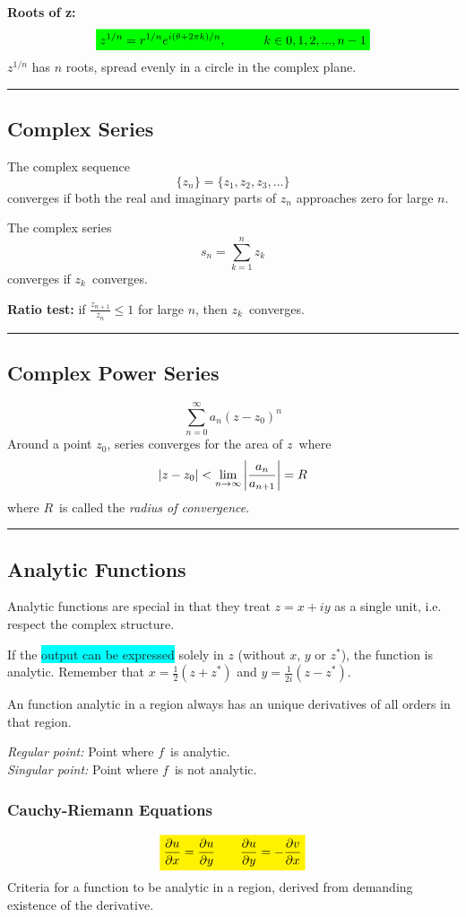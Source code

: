 \documentclass[10pt,a4paper]{article}
\renewcommand{\exp}{e^}
\newcommand{\holine}{\rule{286pt}{1pt}}
\newcommand{\half}{\frac{1}{2}}
\newcommand{\yl}[1]{\colorbox{yellow}{$\displaystyle #1$}}
\newcommand{\gr}[1]{\colorbox{green}{$\displaystyle #1$}}
\newcommand{\bll}{\colorbox{cyan}}
\begin{document}
\begin{multicols}{2}
\textbf{Roots of z:} 
\[\gr{
    z^{1/n} = r^{1/n}\exp{i(\theta + 2\pi k)/n}, \quad\quad\quad k\in 0,1,2,...,n-1
}\]
$z^{1/n}$ has $n$ roots, spread evenly in a circle in the complex plane.



\holine
\subsection*{Complex Series}
The complex sequence
\[
    \{z_n\} = \{z_1, z_2, z_3, ...\}
\]
converges if both the real and imaginary parts of $z_n$ approaches zero for large $n$.

The complex series
\[
    s_n = \sum_{k=1}^n z_k
\]
converges if $z_k$ converges.

\textbf{Ratio test:}
if $\frac{z_{n+1}}{z_n} \leq 1$ for large $n$, then $z_k$ converges.


\holine
\subsection*{Complex Power Series}
\[
    \sum_{n=0}^\infty a_n(z-z_0)^n
\]
Around a point $z_0$, series converges for the area of $z$ where
\[
    |z-z_0| < \lim_{n\rightarrow\infty} \qty|\frac{a_n}{a_{n+1}}| = R
\]
where $R$ is called the \textit{radius of convergence}.


\holine
\subsection*{Analytic Functions}
Analytic functions are special in that they treat $z=x+iy$ as a single unit, i.e. respect the complex structure.

If the \bll{output can be expressed} solely in $z$ (without $x$, $y$ or $z^*$), the function is analytic. Remember that $x = \half (z+z^*)$ and $y=\frac{1}{2i}(z-z^*)$.

An function analytic in a region always has an unique derivatives of all orders in that region.


\textit{Regular point:} Point where $f$ is analytic.\\
\textit{Singular point:} Point where $f$ is not analytic.


\subsubsection*{Cauchy-Riemann Equations}
\[\yl{
    \pdv{u}{x} = \pdv{u}{y} \quad\quad \pdv{u}{y} = - \pdv{v}{x}
}\]
Criteria for a function to be analytic in a region, derived from demanding existence of the derivative.




\end{multicols}
\end{document}
